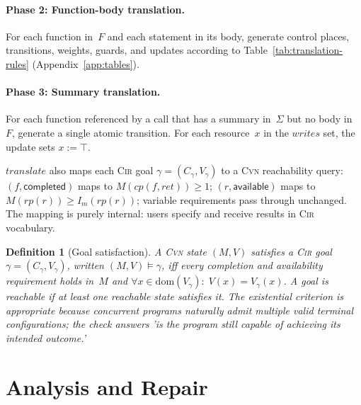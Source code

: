 \documentclass[sigconf]{acmart}
\newtheorem{definition}{Definition}
\begin{document}
\paragraph{Phase 2: Function-body translation.}
For each function in~$F$ and each statement in its body, generate control places, transitions, weights, guards, and updates
according to Table~\ref{tab:translation-rules} (Appendix~\ref{app:tables}).

\paragraph{Phase 3: Summary translation.}
For each function referenced by a \textsf{call} that has a summary in~$\Sigma$ but no body in~$F$, generate a single atomic
transition. For each resource~$x$ in the $\mathit{writes}$ set, the update sets $x:=\top$.


$\mathit{translate}$ also maps each \textsc{Cir} goal $\gamma=(C_\gamma,V_\gamma)$ to a \textsc{Cvn} reachability query: $(f,\textsf{completed})$ maps to $M(\mathit{cp}(f,\mathit{ret}))\geq 1$; $(r,\textsf{available})$ maps to $M(\mathit{rp}(r))\geq I_m(\mathit{rp}(r))$; variable requirements pass through unchanged. The mapping is purely internal: users specify and receive results in \textsc{Cir} vocabulary.

\begin{definition}[Goal satisfaction]
\label{def:goal-sat}
A \textsc{Cvn} state $(M,V)$ \emph{satisfies} a \textsc{Cir} goal $\gamma=(C_\gamma,V_\gamma)$, written $(M,V)\models\gamma$, iff every completion and availability requirement holds in~$M$ and $\forall x\in\mathrm{dom}(V_\gamma):\;V(x)=V_\gamma(x)$.
A goal is \emph{reachable} if at least one reachable state satisfies it. The existential criterion is appropriate because concurrent programs naturally admit multiple valid terminal configurations; the check answers 'is the program still \emph{capable} of achieving its intended outcome.'
\end{definition}


\section{Analysis and Repair}
\label{sec:analysis-repair}
\end{document}
